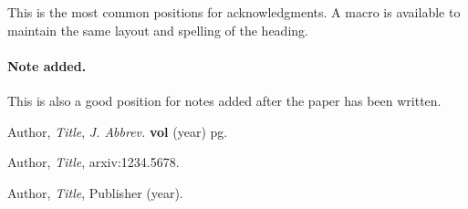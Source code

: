 \documentclass[a4paper,11pt]{article}
\begin{document}
\acknowledgments

This is the most common positions for acknowledgments. A macro is
available to maintain the same layout and spelling of the heading.

\paragraph{Note added.} This is also a good position for notes added
after the paper has been written.






\begin{thebibliography}{99}

Author, \emph{Title}, \emph{J. Abbrev.} {\bf vol} (year) pg.

Author, \emph{Title},
arxiv:1234.5678.

Author, \emph{Title},
Publisher (year).





\end{thebibliography}
\end{document}
